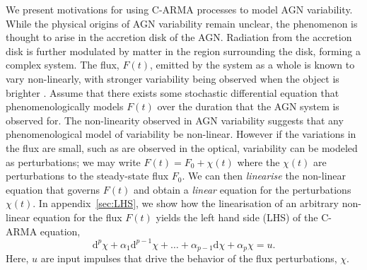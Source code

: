 \documentclass[a4paper,fleqn,usenatbib]{mnras}
\begin{document}

We present motivations for using C-ARMA processes to model AGN variability. While the physical origins of AGN variability remain unclear, the phenomenon is thought to arise in the accretion disk of the AGN. Radiation from the accretion disk is further modulated by matter in the region surrounding the disk, forming a complex system. The flux, $F(t)$, emitted by the system as a whole is known to vary non-linearly, with stronger variability being observed when the object is brighter \citep{UMV05}. Assume that there exists some stochastic differential equation that phenomenologically models $F(t)$ over the duration that the AGN system is observed for. The non-linearity observed in AGN variability suggests that any phenomenological model of variability be non-linear. However if the variations in the flux are small, such as are observed in the optical, variability can be modeled as perturbations; we may write $F(t) = F_{0} + \chi(t)$ where the $\chi(t)$ are perturbations to the steady-state flux $F_{0}$. We can then \textit{linearise} the non-linear equation that governs $F(t)$ and obtain a \textit{linear} equation for the perturbations $\chi(t)$. In appendix~\ref{sec:LHS}, we show how the linearisation of an arbitrary non-linear equation for the flux $F(t)$ yields the left hand side (LHS) of the C-ARMA equation,
\begin{equation}\label{eq:LHS}
\mathrm{d}^{p}\chi + \alpha_{1} \mathrm{d}^{p-1}\chi + \ldots + \alpha_{p-1} \mathrm{d}\chi + \alpha_{p} \chi = u.
\end{equation}
Here, $u$ are input impulses that drive the behavior of the flux perturbations, $\chi$.
\end{document}
